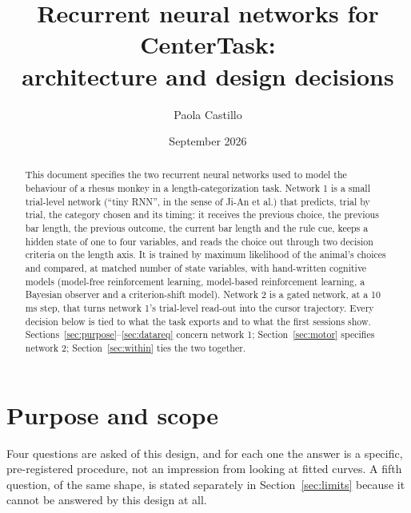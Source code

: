 \documentclass[11pt,a4paper]{article}
\title{Recurrent neural networks for CenterTask:\\
       architecture and design decisions}
\author{Paola Castillo}
\date{September 2026}
\begin{document}
\maketitle

\begin{abstract}
This document specifies the two recurrent neural networks used to model the
behaviour of a rhesus monkey in a length-categorization task. Network 1 is a small
trial-level network (``tiny RNN'', in the sense of Ji-An et al.) that predicts, trial by
trial, the category chosen and its timing: it receives the previous choice, the previous
bar length, the previous outcome, the current bar length and the rule cue, keeps a hidden
state of one to four variables, and reads the choice out through two decision criteria on
the length axis. It is trained by maximum likelihood of the animal's choices and
compared, at matched number of state variables, with hand-written cognitive models
(model-free reinforcement learning, model-based reinforcement learning, a Bayesian
observer and a criterion-shift model). Network 2 is a gated network, at a 10 ms step,
that turns network 1's trial-level read-out into the cursor trajectory. Every decision
below is tied to what the task exports and to what the first sessions show.
Sections~\ref{sec:purpose}--\ref{sec:datareq} concern network 1; Section~\ref{sec:motor}
specifies network 2; Section~\ref{sec:within} ties the two together.
\end{abstract}

\tableofcontents

\section{Purpose and scope}
\label{sec:purpose}

Four questions are asked of this design, and for each one the answer is a specific,
pre-registered procedure, not an impression from looking at fitted curves. A fifth
question, of the same shape, is stated separately in Section~\ref{sec:limits} because it
cannot be answered by this design at all.
\end{document}

